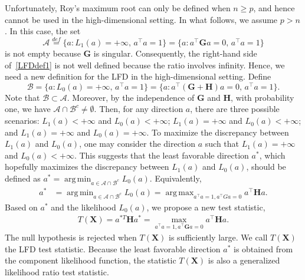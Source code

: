 \documentclass[12pt]{article} %
\DeclareMathOperator*{\argmax}{arg\,max}
\DeclareMathOperator*{\argmin}{arg\,min}
\newcommand{\bX}{\mathbf{X}}
\newcommand{\bH}{\mathbf{H}}
\newcommand{\bG}{\mathbf{G}}
\theoremstyle{definition}
\begin{document}
Unfortunately, Roy's maximum root can only be defined when $n\geq p$, and hence cannot be used in the high-dimensional setting.
In what follows, we assume $p>n$.
In this case,
the set
$$\mathcal{A}\overset{def}{=}\{a:L_1(a)=+\infty, \, a^\top a=1\}=\{a:a^\top \bG a=0, \, a^\top a=1\}$$
is not empty because $\bG$ is singular. 
Consequently, the right-hand side of~\eqref{LFDdef1} is not well defined because the ratio involves infinity.
Hence, we need a new definition for the LFD in the high-dimensional setting.
Define
$$\mathcal{B}=\{a:L_0(a)=+\infty, \, a^\top a=1\}=\{a:a^\top (\bG+\bH)a= 0, \, a^\top a=1\}.$$
Note that $\mathcal{B}\subset \mathcal{A}$.
Moreover, by the independence of $\bG$ and $\bH$, with probability one, we have $\mathcal{A}\cap \mathcal{B}^c\neq \emptyset$.
Then, for any direction $a$, there are three possible scenarios: $L_1(a)<+\infty$ and $L_0(a)<+\infty$; $L_1(a)=+\infty$ and $L_0(a)<+\infty$; and $L_1(a)=+\infty$ and $L_0(a)=+\infty$.
To maximize the discrepancy between $L_1(a)$ and $L_0(a)$, one may consider the direction $a$ such that $L_1(a)=+\infty$ and $L_0(a)<+\infty$.
This suggests that the least favorable direction $a^*$, which hopefully maximizes the discrepancy between $L_1(a)$ and $L_0(a)$, should be defined as $a^* = \argmin_{a\in\mathcal{A}\cap\mathcal{B}^c} L_0 (a)$.
Equivalently,
$$
\begin{aligned}
    a^*&=\argmin_{a\in \mathcal{A}\cap\mathcal{B}^c} L_0(a) = \argmax_{a^\top a=1,a^\top Ga=0} {a^\top \bH a}.
\end{aligned}
$$
Based on $a^*$ and the likelihood $L_0(a)$, we propose a new test statistic,
\begin{equation*}
    \begin{aligned}
        T(\bX)=a^{*T} \bH a^*
        =
        \max_{a^\top a=1, a^\top \bG a=0} 
        a^\top \bH a.
    \end{aligned}
\end{equation*}
The null hypothesis is rejected when $T(\bX)$ is sufficiently large.
We call $T(\bX)$ the LFD test statistic.
Because the least favorable direction $a^*$ is obtained from the component likelihood function, the statistic $T(\bX)$ is also a generalized likelihood ratio test statistic.
\end{document}
